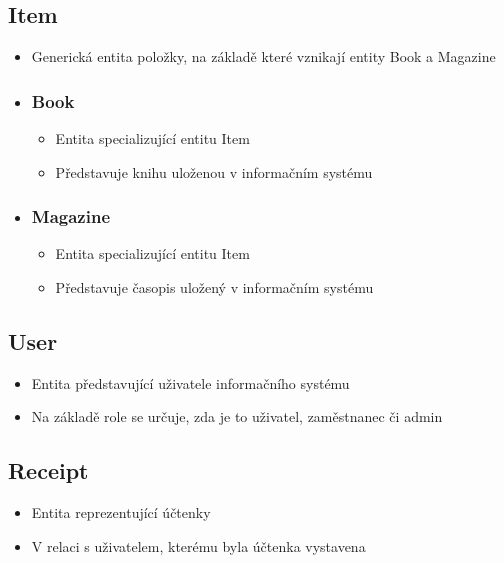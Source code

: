 \documentclass{article}
\begin{document}
\subsection*{Item}
\begin{itemize}
    \item Generická entita položky, na základě které vznikají entity Book a
    Magazine

    \item \subsubsection*{Book}
    \begin{itemize}
        \item Entita specializující entitu Item
        \item Představuje knihu uloženou v informačním systému
    \end{itemize}

    \item \subsubsection*{Magazine}
    \begin{itemize}
        \item Entita specializující entitu Item
        \item Představuje časopis uložený v informačním systému
    \end{itemize}
\end{itemize}

\subsection*{User}
\begin{itemize}
    \item Entita představující uživatele informačního systému
    \item Na základě role se určuje, zda je to uživatel, zaměstnanec či admin
\end{itemize}

\subsection*{Receipt}
\begin{itemize}
    \item Entita reprezentující účtenky
    \item V relaci s uživatelem, kterému byla účtenka vystavena
\end{itemize}
\end{document}
